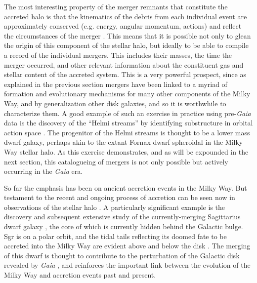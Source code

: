 The most interesting property of the merger remnants that constitute the accreted halo is that the kinematics of the debris from each individual event are approximately conserved (e.g. energy, angular momentum, actions) and reflect the circumstances of the merger \parencite{helmi00,johnston08}. This means that it is possible not only to glean the origin of this component of the stellar halo, but ideally to be able to compile a record of the individual mergers. This includes their masses, the time the merger occurred, and other relevant information about the constituent gas and stellar content of the accreted system. This is a very powerful prospect, since as explained in the previous section mergers have been linked to a myriad of formation and evolutionary mechanisms for many other components of the Milky Way, and by generalization other disk galaxies, and so it is worthwhile to characterize them. A good example of such an exercise in practice using pre-\textit{Gaia} data is the discovery of the ``Helmi streams'' by identifying substructure in orbital action space \parencite{helmi99}. The progenitor of the Helmi streams is thought to be a lower mass dwarf galaxy, perhaps akin to the extant Fornax dwarf spheroidal in the Milky Way stellar halo. As this exercise demonstrates, and as will be expounded in the next section, this catalogueing of mergers is not only possible but actively occurring in the \textit{Gaia} era.

So far the emphasis has been on ancient accretion events in the Milky Way. But testament to the recent and ongoing process of accretion can be seen now in observations of the stellar halo \parencite[e.g. the ``field of streams''][]{belokurov06}. A particularly significant example is the discovery and subsequent extensive study of the currently-merging Sagittarius dwarf galaxy \parencite[Sgr][]{ibata94}, the core of which is currently hidden behind the Galactic bulge. Sgr is on a polar orbit, and the tidal tails reflecting its doomed fate to be accreted into the Milky Way are evident above and below the disk \parencite{majewski03,belokurov06}. The merging of this dwarf is thought to contribute to the perturbation of the Galactic disk revealed by \textit{Gaia} \parencite[see the previous section][]{antoja18,laporte19}, and reinforces the important link between the evolution of the Milky Way and accretion events past and present.

